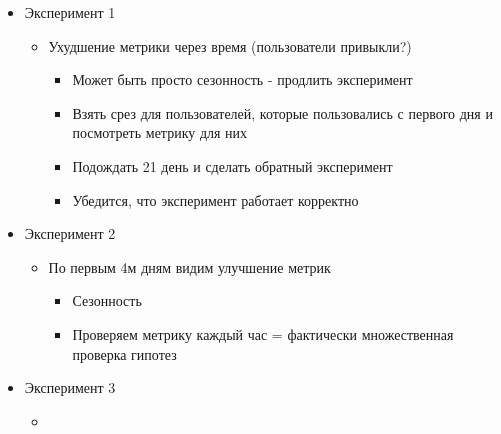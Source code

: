 \documentclass[a4paper, 12pt]{article}
\begin{document}
\begin{itemize}
\item
  
  Эксперимент 1
  

  \begin{itemize}
  \item
    
    Ухудшение метрики через время (пользователи привыкли?)
    

    \begin{itemize}
    \item
      
      Может быть просто сезонность - продлить эксперимент
      
    \item
      
      Взять срез для пользователей, которые пользовались с первого дня и
      посмотреть метрику для них
      
    \item
      
      Подождать 21 день и сделать обратный эксперимент
      
    \item
      
      Убедится, что эксперимент работает корректно
      
    \end{itemize}
  \end{itemize}
\item
  
  Эксперимент 2
  

  \begin{itemize}
  \item
    
    По первым 4м дням видим улучшение метрик
    

    \begin{itemize}
    \item
      
      Сезонность
      
    \item
      
      Проверяем метрику каждый час = фактически множественная проверка
      гипотез
      
    \end{itemize}
  \end{itemize}
\item
  
  Эксперимент 3
  

  \begin{itemize}
  \item
    

\end{itemize}
\end{itemize}
\end{document}
